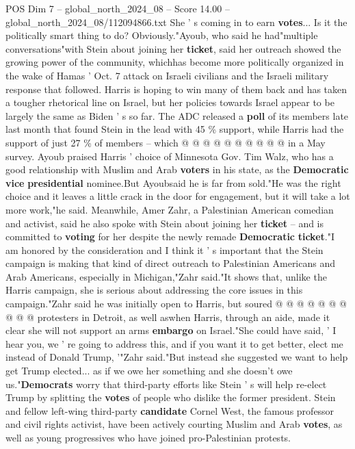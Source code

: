 \begin{textsample}{POS Dim 7 – global\_north\_2024\_08 – Score 14.00 – global\_north\_2024\_08/112094866.txt}
She ' s coming in to earn \textbf{votes}...
Is it the politically smart thing to do?
Obviously."Ayoub, who said he had"multiple conversations"with Stein about joining her \textbf{ticket}, said her outreach showed the growing power of the community, whichhas become more politically organized in the wake of Hamas ' Oct. 7 attack on Israeli civilians and the Israeli military response that followed.
Harris is hoping to win many of them back and has taken a tougher rhetorical line on Israel, but her policies towards Israel appear to be largely the same as Biden ' s so far.
The ADC released a \textbf{poll} of its members late last month that found Stein in the lead with 45 \% support, while Harris had the support of just 27 \% of members -- which @ @ @ @ @ @ @ @ @ @ in a May survey.
Ayoub praised Harris ' choice of Minnesota Gov.
Tim Walz, who has a good relationship with Muslim and Arab \textbf{voters} in his state, as the \textbf{Democratic} \textbf{vice} \textbf{presidential} nominee.But Ayoubsaid he is far from sold."He was the right choice and it leaves a little crack in the door for engagement, but it will take a lot more work,"he said.
Meanwhile, Amer Zahr, a Palestinian American comedian and activist, said he also spoke with Stein about joining her \textbf{ticket} -- and is committed to \textbf{voting} for her despite the newly remade \textbf{Democratic} \textbf{ticket}."I am honored by the consideration and I think it ' s important that the Stein campaign is making that kind of direct outreach to Palestinian Americans and Arab Americans, especially in Michigan,"Zahr said."It shows that, unlike the Harris campaign, she is serious about addressing the core issues in this campaign."Zahr said he was initially open to Harris, but soured @ @ @ @ @ @ @ @ @ @ protesters in Detroit, as well aswhen Harris, through an aide, made it clear she will not support an arms \textbf{embargo} on Israel."She could have said, ' I hear you, we ' re going to address this, and if you want it to get better, elect me instead of Donald Trump, '"Zahr said."But instead she suggested we want to help get Trump elected... as if we owe her something and she doesn't owe us."\textbf{Democrats} worry that third-party efforts like Stein ' s will help re-elect Trump by splitting the \textbf{votes} of people who dislike the former president.
Stein and fellow left-wing third-party \textbf{candidate} Cornel West, the famous professor and civil rights activist, have been actively courting Muslim and Arab \textbf{votes}, as well as young progressives who have joined pro-Palestinian protests.

\end{textsample}
